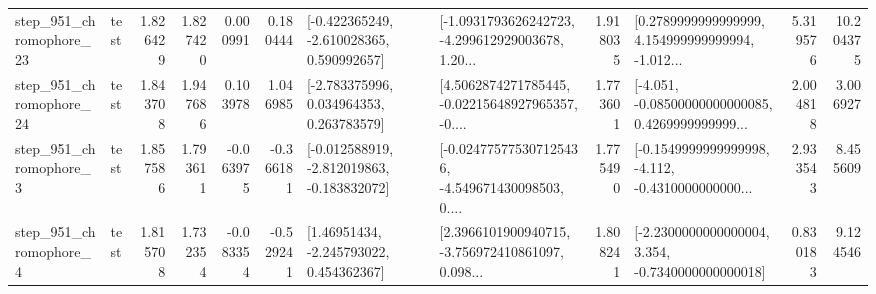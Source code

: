\begin{tabular}{llrrrrllrlrr}
  step\_951\_chromophore\_23 &      test &      1.826429 &    1.827420 &      0.000991 &  0.180444 &   [-0.422365249, -2.610028365, 0.590992657] &  [-1.0931793626242723, -4.299612929003678, 1.20... &       1.918035 &  [0.2789999999999999, 4.154999999999994, -1.012... &            5.319576 &         10.204375 \\
  step\_951\_chromophore\_24 &      test &      1.843708 &    1.947686 &      0.103978 &  1.046985 &    [-2.783375996, 0.034964353, 0.263783579] &  [4.5062874271785445, -0.02215648927965357, -0.... &       1.773601 &  [-4.051, -0.08500000000000085, 0.4269999999999... &            2.004818 &          3.006927 \\
   step\_951\_chromophore\_3 &      test &      1.857586 &    1.793611 &     -0.063975 & -0.366181 &  [-0.012588919, -2.812019863, -0.183832072] &  [-0.024775775307125436, -4.549671430098503, 0.... &       1.775490 &  [-0.1549999999999998, -4.112, -0.4310000000000... &            2.933543 &          8.455609 \\
   step\_951\_chromophore\_4 &      test &      1.815708 &    1.732354 &     -0.083354 & -0.529241 &     [1.46951434, -2.245793022, 0.454362367] &  [2.3966101900940715, -3.756972410861097, 0.098... &       1.808241 &  [-2.2300000000000004, 3.354, -0.7340000000000018] &            0.830183 &          9.124546 \\
\bottomrule
\end{tabular}

